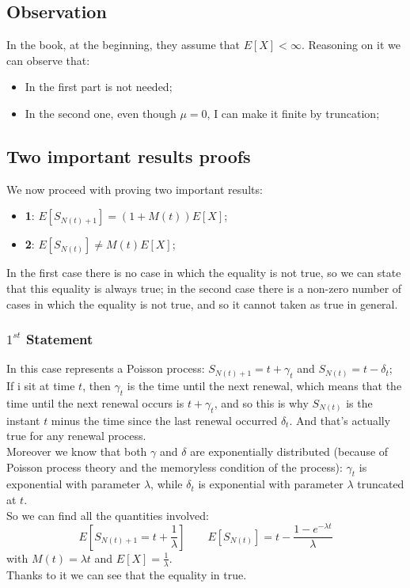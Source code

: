 \documentclass[a4paper, 12pt, openright]{book}
\theoremstyle{theoremdd}
\theoremstyle{remark}
\def \beq {\begin{equation}}
\def\eeq{\end{equation}}
\begin{document}
\subsection*{Observation}
In the book, at the beginning, they assume that $E[X] < \infty$. Reasoning on it we can observe that:
\begin{itemize}
\item In the first part is not needed;
\item In the second one, even though $\mu = 0$, I can make it finite by truncation;
\end{itemize}
\subsection{Two important results proofs}
We now proceed with proving two important results:
\begin{itemize}
\item \textbf{1}: $E[S_{N(t)+1}] = (1+M(t))E[X]$;
\item \textbf{2}: $E[S_{N(t)}] \ne M(t)E[X]$;
\end{itemize}
In the first case there is no case in which the equality is not true, so we can state that this equality is always true; in the second case there is a non-zero number of cases in which the equality is not true, and so it cannot taken as true in general.
\subsubsection*{$1^{st}$ Statement}
In this case represents a Poisson process: $S_{N(t)+1} = t + \gamma_t$ and $S_{N(t)} = t - \delta_t$;\\
If i sit at time $t$, then $\gamma_t$ is the time until the next renewal, which means that the time until the next renewal occurs is $t + \gamma_t$, and so this is why $S_{N(t)}$ is the instant $t$ minus the time since the last renewal occurred $\delta_t$. And that's actually true for any renewal process.\\
Moreover we know that both $\gamma$ and $\delta$ are exponentially distributed (because of Poisson process theory and the memoryless condition of the process): $\gamma_t$ is exponential with parameter $\lambda$, while $\delta_t$ is exponential with parameter $\lambda$ truncated at $t$.\\
So we can find all the quantities involved:%
\beq
E[S_{N(t)+1} = t + \frac{1}{\lambda}] \qquad E[S_{N(t)}] = t - \frac{1-e^{-\lambda t}}{\lambda}
\eeq
with $M(t) = \lambda t$ and $E[X] = \frac{1}{\lambda}$.\\
Thanks to it we can see that the equality in true.
\end{document}

